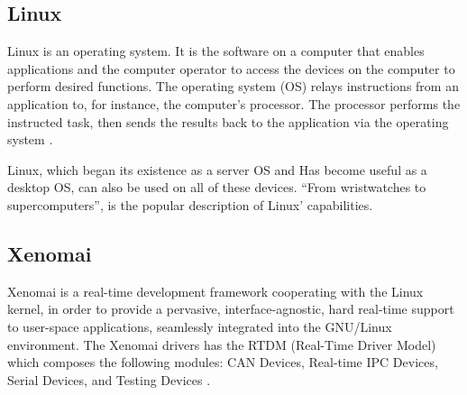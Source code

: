 \documentclass[conference]{IEEEtran}
\begin{document}


%
\subsection{Linux}\label{subsec:linux}

Linux is an operating system. It is the software on a computer that enables applications and the computer operator to access the devices on the computer to perform desired functions. The operating system (OS) relays instructions from an application to, for instance, the computer's processor. The processor performs the instructed task, then sends the results back to the application via the operating system \cite{linux_barabanov1997}.


Linux, which began its existence as a server OS and Has become useful as a desktop OS, can also be used on all of these devices. “From wristwatches to supercomputers”, is the popular description of Linux' capabilities. \cite{linux_foundation}

%
\subsection{Xenomai}\label{subsec:xenomai}

Xenomai \cite{xenomai_api} is a real-time development framework cooperating with the Linux kernel, in order to provide a pervasive, interface-agnostic, hard real-time support to user-space applications, seamlessly integrated into the GNU/Linux environment. The Xenomai drivers has the RTDM (Real-Time Driver Model) which composes the following modules: CAN Devices, Real-time IPC Devices, Serial Devices, and Testing Devices \cite{rtdm_Kiszka}.
%
\end{document}
